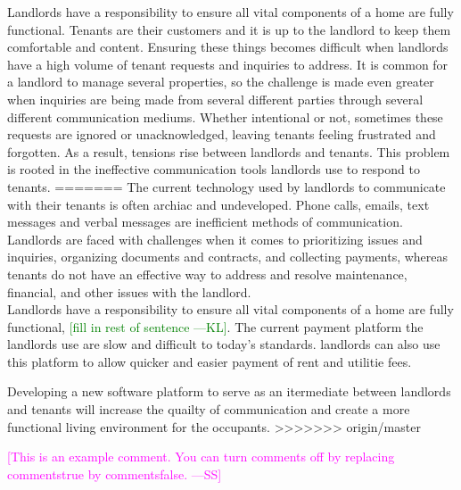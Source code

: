 \documentclass[12pt]{article}
\newcommand{\authornote}[3]{\textcolor{#1}{[#3 ---#2]}}
\newcommand{\authornote}[3]{}
\newcommand{\wss}[1]{\authornote{magenta}{SS}{#1}}
\newcommand{\kly}[1]{\authornote{green}{KL}{#1}}
\begin{document}
Landlords have a responsibility to ensure all vital components of a home are fully functional. Tenants are their customers and it is up to the landlord to keep them comfortable and content. Ensuring these things becomes difficult when landlords have a high volume of tenant requests and inquiries to address. It is common for a landlord to manage several properties, so the challenge is made even greater when inquiries are being made from several different parties through several different communication mediums. Whether intentional or not, sometimes these requests are ignored or unacknowledged, leaving tenants feeling frustrated and forgotten. As a result, tensions rise between landlords and tenants. This problem is rooted in the ineffective communication tools landlords use to respond to tenants. 
=======
The current technology used by landlords to communicate with their tenants is 
often archiac and undeveloped. Phone calls, emails, text messages and verbal 
messages are inefficient methods of communication. Landlords are faced with 
challenges when it comes to prioritizing issues and inquiries, organizing 
documents and contracts, and collecting payments, whereas tenants do not have 
an effective way to address and resolve maintenance, financial, and other 
issues with the landlord. \\

Landlords have a responsibility to ensure all vital components of a home are 
fully functional, \kly{fill in rest of sentence}.
The current payment platform the landlords use are slow and difficult to today's standards.
landlords can also use this platform to allow quicker and easier payment of 
rent and utilitie fees. 

Developing a new software platform to serve as an itermediate between 
landlords and tenants will increase the quailty of communication 
and create a more functional living environment for the occupants.
>>>>>>> origin/master

\wss{This is an example comment.  You can turn comments off by replacing
  commentstrue by commentsfalse.}
\end{document}
